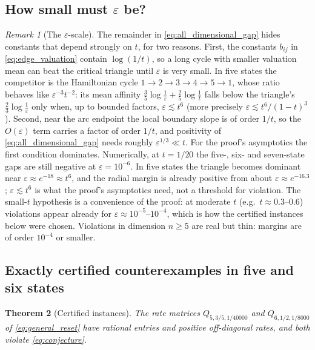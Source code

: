 \documentclass[11pt,a4paper]{article}
\numberwithin{equation}{section}
\newtheorem{theorem}{Theorem}[section]
\theoremstyle{definition}
\theoremstyle{remark}
\newtheorem{remark}[theorem]{Remark}
\newcommand{\eps}{\varepsilon}
\begin{document}
\subsection{How small must \texorpdfstring{\(\eps\)}{epsilon} be?}

\begin{remark}[The \(\eps\)-scale]
\label{rem:scale}
The remainder in \eqref{eq:all_dimensional_gap} hides constants that
depend strongly on \(t\), for two reasons. First, the constants
\(b_{ij}\) in \eqref{eq:edge_valuation} contain \(\log(1/t)\), so a
long cycle with smaller valuation mean can beat the critical triangle
until \(\eps\) is very small. In five states the competitor is the
Hamiltonian cycle \(1\to2\to3\to4\to5\to1\), whose ratio behaves like
\(\eps^{-3}t^{-2}\): its mean affinity
\(\frac35\log\frac1\eps+\frac25\log\frac1t\) falls below the triangle's
\(\frac23\log\frac1\eps\) only when, up to bounded factors,
\(\eps\lesssim t^{6}\) (more precisely
\(\eps\lesssim t^6/(1-t)^3\)). Second, near the arc endpoint the local
boundary slope is of order \(1/t\), so the \(O(\eps)\) term carries a
factor of order \(1/t\), and positivity of \eqref{eq:all_dimensional_gap}
needs roughly \(\eps^{1/3}\ll t\). For the proof's asymptotics the first condition
dominates. Numerically, at \(t=1/20\) the five-, six- and
seven-state gaps are still negative at \(\eps=10^{-6}\). In five states
the triangle becomes dominant near \(\eps\approx e^{-18}\approx t^6\),
and the radial margin is already positive from about
\(\eps\approx e^{-16.3}\); \(\eps\lesssim t^6\) is what the proof's
asymptotics need, not a threshold for violation. The small-\(t\)
hypothesis is a convenience of the proof: at moderate \(t\) (e.g.\
\(t\approx0.3\)--\(0.6\)) violations appear already for
\(\eps\approx10^{-5}\)--\(10^{-4}\), which is how the certified
instances below were chosen. Violations in dimension \(n\ge5\) are
real but thin: margins are of order \(10^{-4}\) or smaller.
\end{remark}

\subsection{Exactly certified counterexamples in five and six states}
\label{sec:certified}

\begin{theorem}[Certified instances]
\label{thm:certified}
The rate matrices \(Q_{5,3/5,1/40000}\) and \(Q_{6,1/2,1/8000}\) of
\eqref{eq:general_reset} have rational entries and positive
off-diagonal rates, and both violate \eqref{eq:conjecture}.
\end{theorem}
\end{document}

